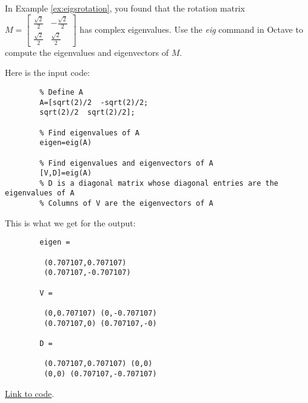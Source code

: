 \documentclass{ximera}
\begin{document}
    \begin{example}\label{ex:complexEig}
        In Example \ref{ex:eigsrotation}, you found that the rotation matrix $M=\begin{bmatrix}
        \frac{\sqrt{2}}{2} & -\frac{\sqrt{2}}{2}\\
        \frac{\sqrt{2}}{2} & \frac{\sqrt{2}}{2}
        \end{bmatrix}$ has complex eigenvalues.  Use the \emph{eig} command in Octave to compute the eigenvalues and eigenvectors of $M$.  
        
        \begin{explanation}
        Here is the input code:
        
        \begin{verbatim}
        % Define A
        A=[sqrt(2)/2  -sqrt(2)/2;
        sqrt(2)/2  sqrt(2)/2];
        
        % Find eigenvalues of A
        eigen=eig(A)
        
        % Find eigenvalues and eigenvectors of A
        [V,D]=eig(A)
        % D is a diagonal matrix whose diagonal entries are the eigenvalues of A
        % Columns of V are the eigenvectors of A
        \end{verbatim}
        
        This is what we get for the output:
        \begin{verbatim}
        eigen =
        
         (0.707107,0.707107)
         (0.707107,-0.707107)
        
        V =
        
         (0,0.707107) (0,-0.707107)
         (0.707107,0) (0.707107,-0)
        
        D =
        
         (0.707107,0.707107) (0,0)
         (0,0) (0.707107,-0.707107)
        \end{verbatim}
        
        \href{https://sagecell.sagemath.org/?z=eJx1jkEKgzAURPeB3GE2AYWWgtviQio9ghtxEepXAzHBGNsev1FoKqXdfOY_ZoYRKKlThlBwVuT1PDmfZOkpA45Rnznb8SibwDkTuCrTglRP5i71QjNst7ZtJA83KdI_Rhl_unnr3sm6OpRNTAqUUMGLVsneGqkxSu_UE4_BzvShZAJdSx3BD_RjkcDF6mU02199GXcLXu8oVg4=&lang=octave&interacts=eJyLjgUAARUAuQ==}{Link to code}.
        

\end{explanation}
\end{example}
\end{document}
